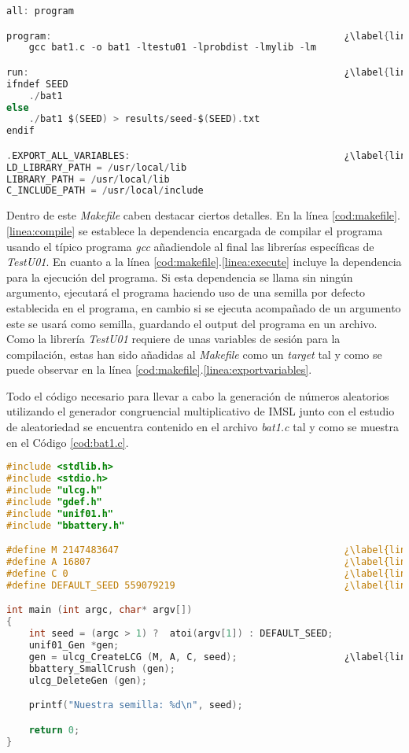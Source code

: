 \documentclass{article}
\begin{document}
\begin{lstlisting}[language=C, escapechar=¿, caption={Makefile del programa}, label={cod:makefile}]
all: program

program:                                                    ¿\label{linea:compile}¿
    gcc bat1.c -o bat1 -ltestu01 -lprobdist -lmylib -lm

run:                                                        ¿\label{linea:execute}¿
ifndef SEED
    ./bat1
else
    ./bat1 $(SEED) > results/seed-$(SEED).txt
endif

.EXPORT_ALL_VARIABLES:                                      ¿\label{linea:exportvariables}¿
LD_LIBRARY_PATH = /usr/local/lib
LIBRARY_PATH = /usr/local/lib
C_INCLUDE_PATH = /usr/local/include
\end{lstlisting}


Dentro de este \emph{Makefile} caben destacar ciertos detalles. En la línea \ref{cod:makefile}.\ref{linea:compile} se establece la dependencia encargada de compilar el programa usando el típico programa \emph{gcc} añadiendole al final las librerías específicas de \emph{TestU01}. En cuanto a la línea \ref{cod:makefile}.\ref{linea:execute} incluye la dependencia para la ejecución del programa. Si esta dependencia se llama sin ningún argumento, ejecutará el programa haciendo uso de una semilla por defecto establecida en el programa, en cambio si se ejecuta acompañado de un argumento este se usará como semilla, guardando el output del programa en un archivo. Como la librería \emph{TestU01} requiere de unas variables de sesión para la compilación, estas han sido añadidas al \emph{Makefile} como un \emph{target} tal y como se puede observar en la línea \ref{cod:makefile}.\ref{linea:exportvariables}.

Todo el código necesario para llevar a cabo la generación de números aleatorios utilizando el generador congruencial multiplicativo de IMSL junto con el estudio de aleatoriedad se encuentra contenido en el archivo \emph{bat1.c} tal y como se muestra en el Código \ref{cod:bat1.c}.

\begin{lstlisting}[language=C, escapechar=¿,caption={bat1.c}, label={cod:bat1.c}]
#include <stdlib.h>
#include <stdio.h>
#include "ulcg.h"
#include "gdef.h"
#include "unif01.h"
#include "bbattery.h"

#define M 2147483647                                        ¿\label{linea:m}¿
#define A 16807                                             ¿\label{linea:a}¿
#define C 0                                                 ¿\label{linea:c}¿
#define DEFAULT_SEED 559079219                              ¿\label{linea:seed}¿

int main (int argc, char* argv[])
{
    int seed = (argc > 1) ?  atoi(argv[1]) : DEFAULT_SEED;
    unif01_Gen *gen;
    gen = ulcg_CreateLCG (M, A, C, seed);                   ¿\label{linea:gencreation}¿
    bbattery_SmallCrush (gen);
    ulcg_DeleteGen (gen);

    printf("Nuestra semilla: %d\n", seed);

    return 0;
}

\end{lstlisting}
\end{document}
